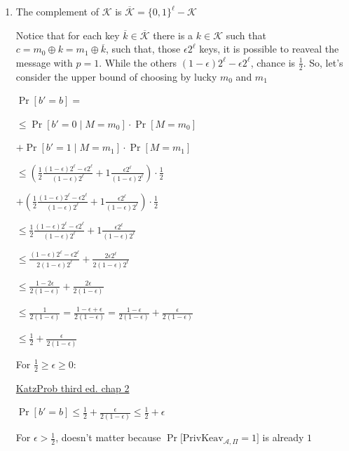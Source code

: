 \vspace{1em}

\begin{enumerate}
	\item[(a)] The complement of $\mathcal{K}$ is $\overline{\mathcal{K}} = \{0,1\}^\ell - \mathcal{K}$

Notice that for each key $\overline{k} \in \overline{\mathcal{K}}$ there is a $k \in \mathcal{K}$ such that $c = m_0 \oplus k = m_1 \oplus \overline{k}$, such that, those $\epsilon2^\ell$ keys, it is possible to reaveal the message with $p=1$. While the others $(1-\epsilon)2^\ell - \epsilon2^\ell$, chance is $\frac{1}{2}$.  So, let's consider the upper bound of choosing by lucky $m_0$ and $m_1$

$\Pr[b' = b] =$

$\le \Pr[b' = 0 \mid M = m_0] \cdot \Pr[M = m_0]$

$+ \Pr[b' = 1 \mid M = m_1] \cdot \Pr[M = m_1]$

$\le ( \frac{1}{2} \frac{(1-\epsilon)2^\ell-\epsilon2^\ell}{(1-\epsilon)2^\ell}  + 1  \frac{\epsilon2^\ell}{(1-\epsilon)2^\ell})\cdot \frac{1}{2}$

$+ ( \frac{1}{2} \frac{(1-\epsilon)2^\ell-\epsilon2^\ell}{(1-\epsilon)2^\ell}  + 1  \frac{\epsilon2^\ell}{(1-\epsilon)2^\ell})\cdot \frac{1}{2}$

$\le \frac{1}{2} \frac{(1-\epsilon)2^\ell-\epsilon2^\ell}{(1-\epsilon)2^\ell}  + 1  \frac{\epsilon2^\ell}{(1-\epsilon)2^\ell}$

$\le \frac{(1-\epsilon)2^\ell-\epsilon2^\ell}{2(1-\epsilon)2^\ell}  + \frac{2\epsilon2^\ell}{2(1-\epsilon)2^\ell}$

$\le \frac{1-2\epsilon}{2(1-\epsilon)}  + \frac{2\epsilon}{2(1-\epsilon)}$

$\le \frac{1}{2(1-\epsilon)} = \frac{1-\epsilon+\epsilon}{2(1-\epsilon)} = \frac{1-\epsilon}{2(1-\epsilon)} + \frac{\epsilon}{2(1-\epsilon)}$

$\le \frac{1}{2} + \frac{\epsilon}{2(1-\epsilon)}$

For $\frac{1}{2} \ge \epsilon \ge 0$:

\href{https://docs.google.com/spreadsheets/d/1qLP6iL_UqS_zug2SqOV1BsSl5UjEBATFUr7Q9GxjIYQ/edit?usp=sharing}{KatzProb third ed. chap 2}

$\Pr[b' = b] \le \frac{1}{2} + \frac{\epsilon}{2(1-\epsilon)} \le \frac{1}{2} + \epsilon$

For $\epsilon > \frac{1}{2}$, doesn't matter because $\Pr\bigl[\text{PrivKeav}_{\mathcal{A},\Pi}=1\bigr]$ is already $1$


\end{enumerate}
